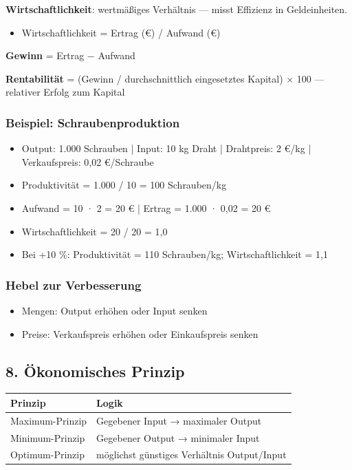 \documentclass[11pt, a4paper]{article}
\begin{document}
\textbf{Wirtschaftlichkeit}: wertmäßiges Verhältnis — misst Effizienz in Geldeinheiten.

\begin{itemize}
  \item Wirtschaftlichkeit = Ertrag (€) / Aufwand (€)
\end{itemize}

\textbf{Gewinn} = Ertrag − Aufwand


\textbf{Rentabilität} = (Gewinn / durchschnittlich eingesetztes Kapital) × 100 — relativer Erfolg zum Kapital



\subsubsection{Beispiel: Schraubenproduktion}
\begin{itemize}
  \item Output: 1.000 Schrauben | Input: 10 kg Draht | Drahtpreis: 2 €/kg | Verkaufspreis: 0,02 €/Schraube
  \item Produktivität = 1.000 / 10 = 100 Schrauben/kg
  \item Aufwand = 10 · 2 = 20 € | Ertrag = 1.000 · 0,02 = 20 €
  \item Wirtschaftlichkeit = 20 / 20 = 1,0
  \item Bei +10 \%: Produktivität = 110 Schrauben/kg; Wirtschaftlichkeit = 1,1
\end{itemize}


\subsubsection{Hebel zur Verbesserung}
\begin{itemize}
  \item Mengen: Output erhöhen oder Input senken
  \item Preise: Verkaufspreis erhöhen oder Einkaufspreis senken
\end{itemize}


\subsection{8. Ökonomisches Prinzip}


{\small
\begin{tabularx}{\linewidth}{XX}
\hline
\rowcolor{tableheadbg}
{\color{white}\textbf{Prinzip}} & {\color{white}\textbf{Logik}} \\[2pt]
\hline
\endhead
\hline
\endfoot
Maximum-Prinzip & Gegebener Input → maximaler Output \\
Minimum-Prinzip & Gegebener Output → minimaler Input \\
Optimum-Prinzip & möglichst günstiges Verhältnis Output/Input \\
\end{tabularx}
}
\end{document}
